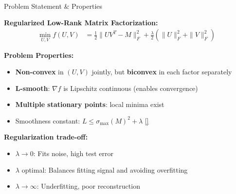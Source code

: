 \documentclass[aspectratio=169,usenames,dvipsnames]{beamer}
\begin{document}
\begin{frame}{Problem Statement \& Properties}

\textbf{Regularized Low-Rank Matrix Factorization:}
\begin{align}
\min_{U, V} f(U, V) &= \frac{1}{2}\|UV^T - M\|_F^2 + \frac{\lambda}{2}(\|U\|_F^2 + \|V\|_F^2) \label{eq:objective}
\end{align}

\vspace{0.3cm}

\textbf{Problem Properties:}
\begin{itemize}
  \item \textbf{Non-convex} in $(U, V)$ jointly, but \textbf{biconvex} in each factor separately
  \item \textbf{L-smooth}: $\nabla f$ is Lipschitz continuous (enables convergence)
  \item \textbf{Multiple stationary points}: local minima exist
  \item Smoothness constant: $L \leq \sigma_{\max}(M)^2 + \lambda$ \hyperlink{app:smoothness}{[\checkmark]}
\end{itemize}

\vspace{0.3cm}

\textbf{Regularization trade-off:}
\begin{itemize}
  \item $\lambda \to 0$: Fits noise, high test error
  \item $\lambda$ optimal: Balances fitting signal and avoiding overfitting
  \item $\lambda \to \infty$: Underfitting, poor reconstruction
\end{itemize}

\end{frame}
\end{document}
